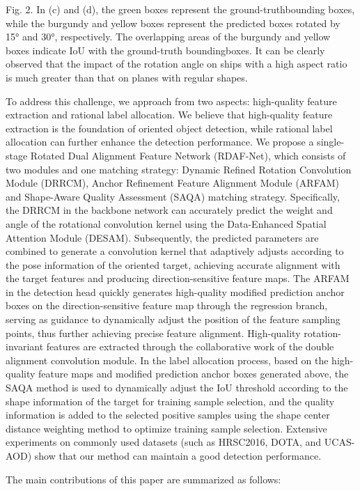 \documentclass[10pt,twocolumn,final]{article}
\begin{document}
Fig. 2. In (c) and (d), the green boxes represent the ground-truthbounding boxes, while the burgundy and yellow boxes represent the predicted boxes rotated by 15° and 30°, respectively. The overlapping areas of the burgundy and yellow boxes indicate IoU with the ground-truth boundingboxes. It can be clearly observed that the impact of the rotation angle on ships with a high aspect ratio is much greater than that on planes with regular shapes.

To address this challenge, we approach from two aspects: high-quality feature extraction and rational label allocation. We believe that high-quality feature extraction is the foundation of oriented object detection, while rational label allocation can further enhance the detection performance. We propose a single-stage Rotated Dual Alignment Feature Network (RDAF-Net), which consists of two modules and one matching strategy: Dynamic Refined Rotation Convolution Module (DRRCM), Anchor Refinement Feature Alignment Module (ARFAM) and Shape-Aware Quality Assessment (SAQA) matching strategy. Specifically, the DRRCM in the backbone network can accurately predict the weight and angle of the rotational convolution kernel using the Data-Enhanced Spatial Attention Module (DESAM). Subsequently, the predicted parameters are combined to generate a convolution kernel that adaptively adjusts according to the pose information of the oriented target, achieving accurate alignment with the target features and producing direction-sensitive feature maps. The ARFAM in the detection head quickly generates high-quality modified prediction anchor boxes on the direction-sensitive feature map through the regression branch, serving as guidance to dynamically adjust the position of the feature sampling points, thus further achieving precise feature alignment. High-quality rotation-invariant features are extracted through the collaborative work of the double alignment convolution module. In the label allocation process, based on the high-quality feature maps and modified prediction anchor boxes generated above, the SAQA method is used to dynamically adjust the IoU threshold according to the shape information of the target for training sample selection, and the quality information is added to the selected positive samples using the shape center distance weighting method to optimize training sample selection. Extensive experiments on commonly used datasets (such as HRSC2016, DOTA, and UCAS-AOD) show that our method can maintain a good detection performance.

The main contributions of this paper are summarized as follows:
\end{document}
